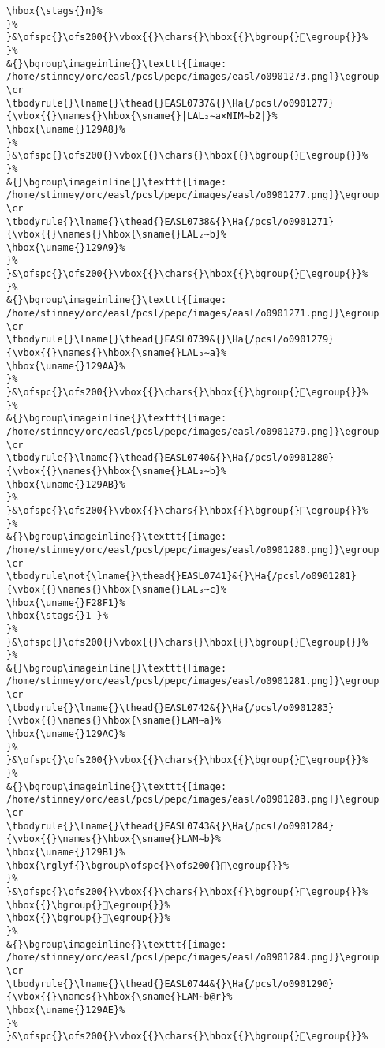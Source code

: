 \begin{verbatim}
\hbox{\stags{}n}%
}%
}&\ofspc{}\ofs200{}\vbox{{}\chars{}\hbox{{}\bgroup{}𒦧\egroup{}}%
}%
&{}\bgroup\imageinline{}\texttt{[image: /home/stinney/orc/easl/pcsl/pepc/images/easl/o0901273.png]}\egroup
\cr
\tbodyrule{}\lname{}\thead{}EASL0737&{}\Ha{/pcsl/o0901277}{\vbox{{}\names{}\hbox{\sname{}|LAL₂∼a×NIM∼b2|}%
\hbox{\uname{}129A8}%
}%
}&\ofspc{}\ofs200{}\vbox{{}\chars{}\hbox{{}\bgroup{}𒦨\egroup{}}%
}%
&{}\bgroup\imageinline{}\texttt{[image: /home/stinney/orc/easl/pcsl/pepc/images/easl/o0901277.png]}\egroup
\cr
\tbodyrule{}\lname{}\thead{}EASL0738&{}\Ha{/pcsl/o0901271}{\vbox{{}\names{}\hbox{\sname{}LAL₂∼b}%
\hbox{\uname{}129A9}%
}%
}&\ofspc{}\ofs200{}\vbox{{}\chars{}\hbox{{}\bgroup{}𒦩\egroup{}}%
}%
&{}\bgroup\imageinline{}\texttt{[image: /home/stinney/orc/easl/pcsl/pepc/images/easl/o0901271.png]}\egroup
\cr
\tbodyrule{}\lname{}\thead{}EASL0739&{}\Ha{/pcsl/o0901279}{\vbox{{}\names{}\hbox{\sname{}LAL₃∼a}%
\hbox{\uname{}129AA}%
}%
}&\ofspc{}\ofs200{}\vbox{{}\chars{}\hbox{{}\bgroup{}𒦪\egroup{}}%
}%
&{}\bgroup\imageinline{}\texttt{[image: /home/stinney/orc/easl/pcsl/pepc/images/easl/o0901279.png]}\egroup
\cr
\tbodyrule{}\lname{}\thead{}EASL0740&{}\Ha{/pcsl/o0901280}{\vbox{{}\names{}\hbox{\sname{}LAL₃∼b}%
\hbox{\uname{}129AB}%
}%
}&\ofspc{}\ofs200{}\vbox{{}\chars{}\hbox{{}\bgroup{}𒦫\egroup{}}%
}%
&{}\bgroup\imageinline{}\texttt{[image: /home/stinney/orc/easl/pcsl/pepc/images/easl/o0901280.png]}\egroup
\cr
\tbodyrule\not{\lname{}\thead{}EASL0741}&{}\Ha{/pcsl/o0901281}{\vbox{{}\names{}\hbox{\sname{}LAL₃∼c}%
\hbox{\uname{}F28F1}%
\hbox{\stags{}1-}%
}%
}&\ofspc{}\ofs200{}\vbox{{}\chars{}\hbox{{}\bgroup{}󲣱\egroup{}}%
}%
&{}\bgroup\imageinline{}\texttt{[image: /home/stinney/orc/easl/pcsl/pepc/images/easl/o0901281.png]}\egroup
\cr
\tbodyrule{}\lname{}\thead{}EASL0742&{}\Ha{/pcsl/o0901283}{\vbox{{}\names{}\hbox{\sname{}LAM∼a}%
\hbox{\uname{}129AC}%
}%
}&\ofspc{}\ofs200{}\vbox{{}\chars{}\hbox{{}\bgroup{}𒦬\egroup{}}%
}%
&{}\bgroup\imageinline{}\texttt{[image: /home/stinney/orc/easl/pcsl/pepc/images/easl/o0901283.png]}\egroup
\cr
\tbodyrule{}\lname{}\thead{}EASL0743&{}\Ha{/pcsl/o0901284}{\vbox{{}\names{}\hbox{\sname{}LAM∼b}%
\hbox{\uname{}129B1}%
\hbox{\rglyf{}\bgroup\ofspc{}\ofs200{}𒦱\egroup{}}%
}%
}&\ofspc{}\ofs200{}\vbox{{}\chars{}\hbox{{}\bgroup{}𒦭\egroup{}}%
\hbox{{}\bgroup{}𒦱\egroup{}}%
\hbox{{}\bgroup{}𒦲\egroup{}}%
}%
&{}\bgroup\imageinline{}\texttt{[image: /home/stinney/orc/easl/pcsl/pepc/images/easl/o0901284.png]}\egroup
\cr
\tbodyrule{}\lname{}\thead{}EASL0744&{}\Ha{/pcsl/o0901290}{\vbox{{}\names{}\hbox{\sname{}LAM∼b@r}%
\hbox{\uname{}129AE}%
}%
}&\ofspc{}\ofs200{}\vbox{{}\chars{}\hbox{{}\bgroup{}𒦮\egroup{}}%

\end{verbatim}
